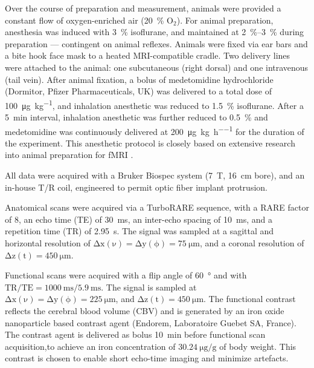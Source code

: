Over the course of preparation and measurement, animals were provided a constant flow of oxygen-enriched air (\SI{20}{\percent} $\mathrm{O_2}$).
For animal preparation, anesthesia was induced with \SI{3}{\percent} isoflurane, and maintained at \SIrange{2}{3}{\percent} during preparation --- contingent on animal reflexes.
Animals were fixed via ear bars and a bite hook face mask to a heated MRI-compatible cradle.
Two delivery lines were attached to the animal: one subcutaneous (right dorsal) and one intravenous (tail vein).
After animal fixation, a bolus of medetomidine hydrochloride (Dormitor, Pfizer Pharmaceuticals, UK) was delivered to a total dose of \SI{100}{\micro\gram\per\kilo\gram}, and inhalation anesthetic was reduced to \SI{1.5}{\percent} isoflurane.
After a \SI{5}{\minute} interval, inhalation anesthetic was further reduced to \SI{0.5}{\percent} and medetomidine was continuously delivered at \SI{200}{\micro\gram\per\kilo\gram\per\hour} for the duration of the experiment.
This anesthetic protocol is closely based on extensive research into animal preparation for fMRI \cite{Grandjean2014}.

All data were acquired with a Bruker Biospec system (\SI{7}{\tesla}, \SI{16}{\centi\meter} bore), and an in-house T/R coil, engineered to permit optic fiber implant protrusion.

Anatomical scans were acquired via a TurboRARE sequence, with a RARE factor of 8, an echo time (TE) of \SI{30}{\milli\second}, an inter-echo spacing of \SI{10}{\milli\second}, and a repetition time (TR) of \SI{2.95}{\second}.
The signal was sampled at a sagittal and horizontal resolution of $\mathrm{\Delta x(\nu)=\Delta y(\phi)=\SI{75}{\micro\meter}}$, and a coronal resolution of $\mathrm{\Delta z(t)=\SI{450}{\micro\meter}}$.

Functional scans were acquired with a flip angle of \SI{60}{\degree} and with $\mathrm{TR/TE = \SI{1000}{\milli\second}/\SI{5.9}{\milli\second}}$.
The signal is sampled at $\mathrm{\Delta x(\nu)=\Delta y(\phi)=\SI{225}{\micro\meter}}$, and $\mathrm{\Delta z(t)=\SI{450}{\micro\meter}}$.
The functional contrast reflects the cerebral blood volume (CBV) and is generated by an iron oxide nanoparticle based contrast agent (Endorem, Laboratoire Guebet SA, France).
The contrast agent is delivered as bolus \SI{10}{\minute} before functional scan acquisition,to achieve an iron concentration of $\SI{30.24}{\micro\gram\per\gram}$ of body weight.
This contrast is chosen to enable short echo-time imaging and minimize artefacts.

